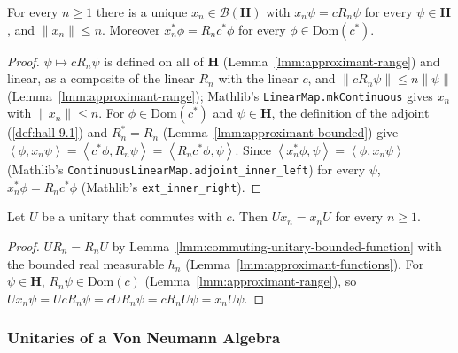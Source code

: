 \begin{lemma}
    \label{lmm:approximant-operator}
    \leanok
    For every $n \ge 1$ there is a unique $x_n \in \mathcal{B}(\mathbf{H})$ with $x_n\psi = cR_n\psi$ for every $\psi \in \mathbf{H}$, and $\|x_n\| \le n$. Moreover $x_n^*\phi = R_nc^*\phi$ for every $\phi \in \text{Dom}(c^*)$.
\end{lemma}
\begin{proof}
    \leanok
    $\psi \mapsto cR_n\psi$ is defined on all of $\mathbf{H}$ (Lemma~\ref{lmm:approximant-range}) and linear, as a composite of the linear $R_n$ with the linear $c$, and $\|cR_n\psi\| \le n\|\psi\|$ (Lemma~\ref{lmm:approximant-range}); Mathlib's \texttt{LinearMap.mkContinuous} gives $x_n$ with $\|x_n\| \le n$. For $\phi \in \text{Dom}(c^*)$ and $\psi \in \mathbf{H}$, the definition of the adjoint (\ref{def:hall-9.1}) and $R_n^* = R_n$ (Lemma~\ref{lmm:approximant-bounded}) give $\left< \phi, x_n\psi \right> = \left< c^*\phi, R_n\psi \right> = \left< R_nc^*\phi, \psi \right>$. Since $\left< x_n^*\phi, \psi \right> = \left< \phi, x_n\psi \right>$ (Mathlib's \texttt{ContinuousLinearMap.adjoint\_inner\_left}) for every $\psi$, $x_n^*\phi = R_nc^*\phi$ (Mathlib's \texttt{ext\_inner\_right}).
\end{proof}

\begin{lemma}
    \label{lmm:approximant-operator-commutes}
    \leanok
    Let $U$ be a unitary that commutes with $c$. Then $Ux_n = x_nU$ for every $n \ge 1$.
\end{lemma}
\begin{proof}
    \leanok
    $UR_n = R_nU$ by Lemma~\ref{lmm:commuting-unitary-bounded-function} with the bounded real measurable $h_n$ (Lemma~\ref{lmm:approximant-functions}). For $\psi \in \mathbf{H}$, $R_n\psi \in \text{Dom}(c)$ (Lemma~\ref{lmm:approximant-range}), so $Ux_n\psi = UcR_n\psi = cUR_n\psi = cR_nU\psi = x_nU\psi$.
\end{proof}

\subsubsection{Unitaries of a Von Neumann Algebra}

